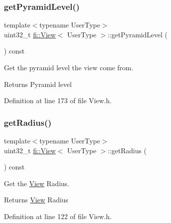 \subsubsection{\texorpdfstring{get\+Pyramid\+Level()}{getPyramidLevel()}}
{\footnotesize\ttfamily template$<$typename User\+Type$>$ \\
uint32\+\_\+t \hyperlink{classfi_1_1View}{fi\+::\+View}$<$ User\+Type $>$\+::get\+Pyramid\+Level (\begin{DoxyParamCaption}{ }\end{DoxyParamCaption}) const\hspace{0.3cm}{\ttfamily [inline]}}



Get the pyramid level the view come from. 

\begin{DoxyReturn}{Returns}
Pyramid level 
\end{DoxyReturn}


Definition at line 173 of file View.\+h.

\mbox{\label{classfi_1_1View_a5fb12e145b33bc8b27a58d56d23fb774}} 
\subsubsection{\texorpdfstring{get\+Radius()}{getRadius()}}
{\footnotesize\ttfamily template$<$typename User\+Type$>$ \\
uint32\+\_\+t \hyperlink{classfi_1_1View}{fi\+::\+View}$<$ User\+Type $>$\+::get\+Radius (\begin{DoxyParamCaption}{ }\end{DoxyParamCaption}) const\hspace{0.3cm}{\ttfamily [inline]}}



Get the \hyperlink{classfi_1_1View}{View} Radius. 

\begin{DoxyReturn}{Returns}
\hyperlink{classfi_1_1View}{View} Radius 
\end{DoxyReturn}


Definition at line 122 of file View.\+h.

